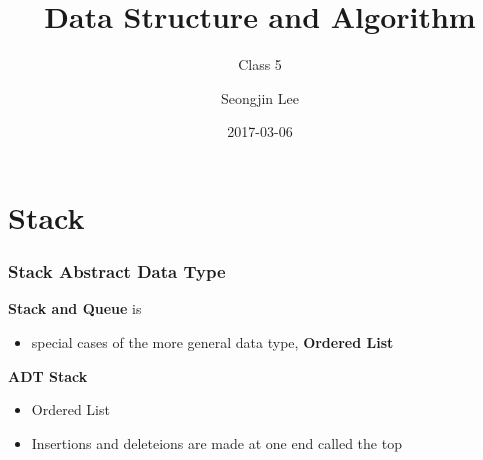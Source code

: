 \documentclass[newPxFont,sthlmFooter,nooffset]{beamer}
\title{Data Structure and Algorithm}
\subtitle{Class 5}
\author[SJL]{Seongjin Lee}
\institute{\href{mailto:insight@gnu.ac.kr}{insight@gnu.ac.kr}\\\url{http://resourceful.github.io}\\Systems Research Lab.\\GNU}
\date{2017-03-06}
\begin{document}
\frame[plain,t]{\titlepage} 



\section{Stack} 
\begin{frame}[t]
  \frametitle{Stack Abstract Data Type}
\textbf{Stack and Queue} is
\begin{itemize}
\item special cases of the more general data type, \textbf{Ordered List}
\end{itemize}

\textbf{ADT Stack}
\begin{itemize}
\item Ordered List
\item Insertions and deleteions are made at one end called the top
\end{itemize}
\end{frame}
\end{document}
